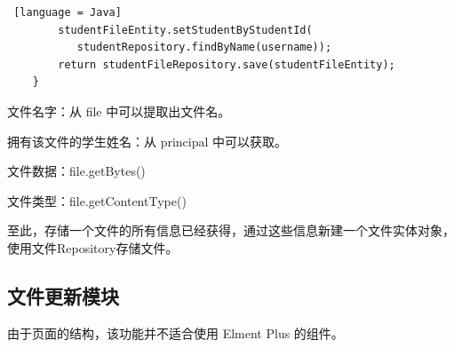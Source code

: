 \begin{itemize}
\begin{itemize}
\begin{lstlisting} [language = Java]
        studentFileEntity.setStudentByStudentId(
           studentRepository.findByName(username));
        return studentFileRepository.save(studentFileEntity);
    }
        \end{lstlisting}
                文件名字：从 file 中可以提取出文件名。

                拥有该文件的学生姓名：从 principal 中可以获取。

                文件数据：file.getBytes()

                文件类型：file.getContentType()

                至此，存储一个文件的所有信息已经获得，通过这些信息新建一个文件实体对象，使用文件Repository存储文件。
        \end{itemize}
\end{itemize}

\subsection{文件更新模块}

由于页面的结构，该功能并不适合使用 Elment Plus 的组件。

